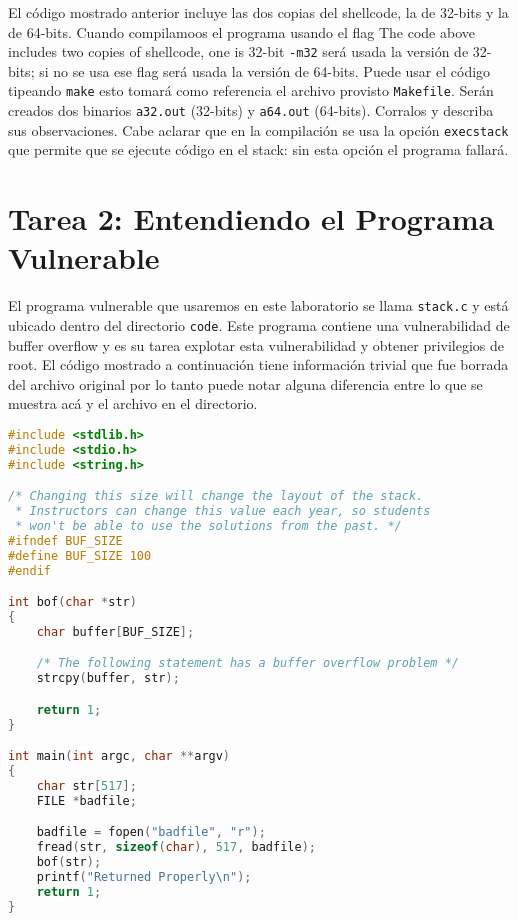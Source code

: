 El código mostrado anterior incluye las dos copias del shellcode, la de 32-bits y la de 64-bits. Cuando compilamoos el programa usando el flag 
The code above includes two copies of shellcode, one is 32-bit \texttt{-m32} será usada la versión de 32-bits; si no se usa ese flag será usada la versión de 64-bits. 
Puede usar el código tipeando \texttt{make} esto tomará como referencia el archivo provisto \texttt{Makefile}.
Serán creados dos binarios \texttt{a32.out} (32-bits) y  \texttt{a64.out} (64-bits).
Corralos y describa sus observaciones.
Cabe aclarar que en la compilación se usa la opción \texttt{execstack} que permite que se ejecute código en el stack: sin esta opción el programa fallará.




\section{Tarea 2: Entendiendo el Programa Vulnerable}
\label{sec:vulnerable_program}

El programa vulnerable que usaremos en este laboratorio se llama \texttt{stack.c} y está ubicado dentro del directorio  \texttt{code}.
Este programa contiene una vulnerabilidad de buffer overflow y es su tarea explotar esta vulnerabilidad y obtener privilegios de root.
El código mostrado a continuación tiene información trivial que fue borrada del archivo original por lo tanto puede notar alguna diferencia entre lo que se muestra acá y el archivo en el directorio.

\begin{lstlisting}[language=C, caption={The vulnerable program (\texttt{stack.c})}]
#include <stdlib.h>
#include <stdio.h>
#include <string.h>

/* Changing this size will change the layout of the stack.
 * Instructors can change this value each year, so students
 * won't be able to use the solutions from the past. */
#ifndef BUF_SIZE
#define BUF_SIZE 100
#endif

int bof(char *str)
{
    char buffer[BUF_SIZE];

    /* The following statement has a buffer overflow problem */ 
    strcpy(buffer, str);          

    return 1;
}

int main(int argc, char **argv)
{
    char str[517];
    FILE *badfile;

    badfile = fopen("badfile", "r");
    fread(str, sizeof(char), 517, badfile);
    bof(str);
    printf("Returned Properly\n");
    return 1;
}
\end{lstlisting}

